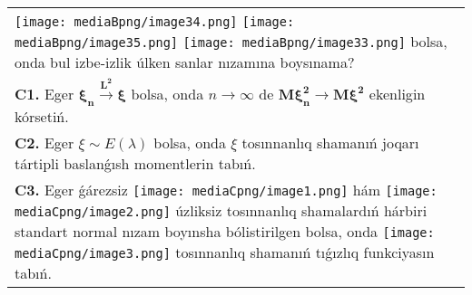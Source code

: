 \documentclass{article}
\begin{document}
\begin{tabular}{m{17cm}}
\texttt{[image: mediaBpng/image34.png]} \texttt{[image: mediaBpng/image35.png]} \texttt{[image: mediaBpng/image33.png]}
bolsa, onda bul izbe-izlik úlken sanlar nızamına boysınama?
 \\
\textbf{C1.} Eger \(\mathbf{\xi}_{\mathbf{n}}\overset{\mathbf{L}^{\mathbf{2}}}{\rightarrow}\mathbf{\xi}\) bolsa, onda \(n \rightarrow \infty\) de \(\mathbf{M}\mathbf{\xi}_{\mathbf{n}}^{\mathbf{2}}\mathbf{\rightarrow M}\mathbf{\xi}^{\mathbf{2}}\) ekenligin kórsetiń.
 \\
\textbf{C2.} Eger \(\xi\sim E(\lambda)\) bolsa, onda \(\xi\) tosınnanlıq shamanıń joqarı tártipli baslanǵısh momentlerin tabıń.
 \\
\textbf{C3.} 
Eger ǵárezsiz \texttt{[image: mediaCpng/image1.png]} hám \texttt{[image: mediaCpng/image2.png]} úzliksiz tosınnanlıq shamalardıń hárbiri standart normal nızam boyınsha bólistirilgen bolsa, onda \texttt{[image: mediaCpng/image3.png]} tosınnanlıq shamanıń tıǵızlıq funkciyasın tabıń.
 \\

\end{tabular}
\vspace{1cm}
\end{document}
